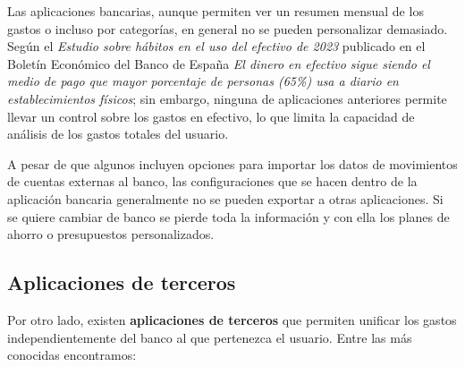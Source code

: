 Las aplicaciones bancarias, aunque permiten ver un resumen mensual de los gastos o incluso por categorías, en general no se pueden personalizar demasiado. Según el \textit{Estudio sobre hábitos en el uso del efectivo de 2023} publicado en el Boletín Económico del Banco de España \textit{El dinero en efectivo sigue siendo el medio de pago que mayor porcentaje de personas (65\%) usa a diario en establecimientos físicos}\cite{2023estudio-efectivo}; sin embargo, ninguna de aplicaciones anteriores permite llevar un control sobre los gastos en efectivo, lo que limita la capacidad de análisis de los gastos totales del usuario.

A pesar de que algunos incluyen opciones para importar los datos de movimientos de 
cuentas externas al banco, las configuraciones que se hacen dentro de 
la aplicación bancaria generalmente no se pueden exportar a otras aplicaciones.
Si se quiere cambiar de banco se pierde toda la información 
y con ella los planes de ahorro o presupuestos personalizados.

\subsection{Aplicaciones de terceros}
Por otro lado, existen \textbf{aplicaciones de terceros} que permiten unificar los gastos 
independientemente del banco al que pertenezca el usuario. Entre las más conocidas 
encontramos:

